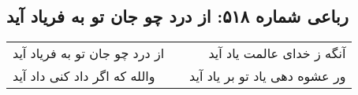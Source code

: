 \begin{center}
\section*{رباعی شماره ۵۱۸: از درد چو جان تو به فریاد آید}
\label{sec:0518}
\begin{longtable}{l p{0.5cm} r}
از درد چو جان تو به فریاد آید
&&
آنگه ز خدای عالمت یاد آید
\\
والله که اگر داد کنی داد آید
&&
ور عشوه دهی یاد تو بر یاد آید
\\
\end{longtable}
\end{center}
